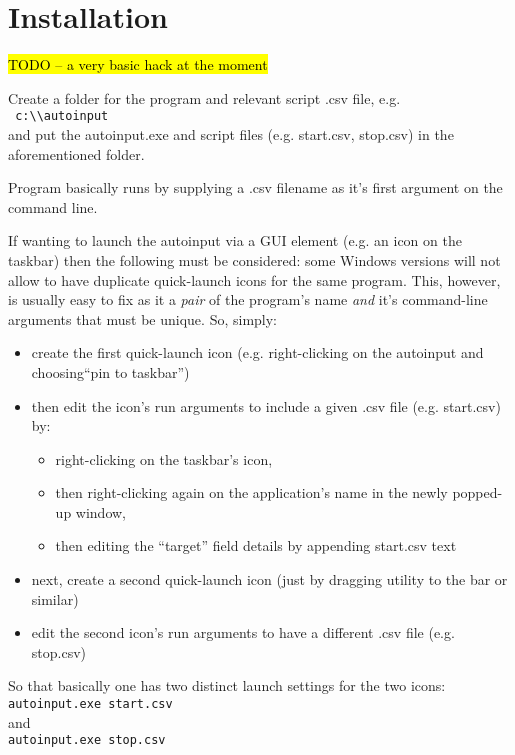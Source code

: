 \documentclass[12pt,a4paper]{article}
\begin{document}
\section{Installation}

\hl{TODO -- a very basic hack at the moment}

Create a folder for the program and relevant script .csv file, e.g. \\ 
\texttt{ c:\textbackslash\textbackslash autoinput } \\
 and put the autoinput.exe and script files (e.g. start.csv, stop.csv) in the aforementioned folder.

Program basically runs by supplying a .csv filename as it's first argument on the command line. 

If wanting to launch the autoinput via a GUI element (e.g. an icon on the taskbar) then the following must be considered: some Windows\textsuperscript{\textregistered} versions will not allow to have duplicate quick-launch icons for the same program. This, however, is usually easy to fix as it a \textit{pair} of the program's name \textit{and} it's command-line arguments that must be unique. So, simply:
\begin{itemize} 
\item create the first quick-launch icon (e.g. right-clicking on the autoinput and choosing``pin to taskbar'')
\item then edit the icon's run arguments to include a given .csv file (e.g. start.csv) by:
\begin{itemize} 
\item right-clicking on the taskbar's icon, 
\item then right-clicking again on the application's name in the newly popped-up window, 
\item then editing the ``target'' field details by appending start.csv text
\end{itemize}
\item next, create a second quick-launch icon (just by dragging utility to the bar or similar)
\item edit the second icon's run arguments to have a different .csv file (e.g. stop.csv)
\end{itemize}
So that basically one has two distinct launch settings for the two icons: \\
\texttt{autoinput.exe start.csv} \\ 
and \\
\texttt{autoinput.exe stop.csv}
\end{document}
